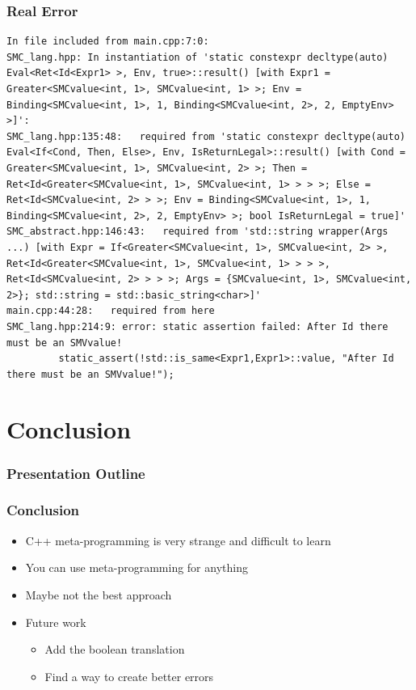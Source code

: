 \documentclass{beamer}
\begin{document}
\begin{frame}[fragile]
\frametitle{Real Error}
\begin{tiny}
\begin{lstlisting}[basicstyle=\tiny]
In file included from main.cpp:7:0:
SMC_lang.hpp: In instantiation of 'static constexpr decltype(auto) Eval<Ret<Id<Expr1> >, Env, true>::result() [with Expr1 = Greater<SMCvalue<int, 1>, SMCvalue<int, 1> >; Env = Binding<SMCvalue<int, 1>, 1, Binding<SMCvalue<int, 2>, 2, EmptyEnv> >]':
SMC_lang.hpp:135:48:   required from 'static constexpr decltype(auto) Eval<If<Cond, Then, Else>, Env, IsReturnLegal>::result() [with Cond = Greater<SMCvalue<int, 1>, SMCvalue<int, 2> >; Then = Ret<Id<Greater<SMCvalue<int, 1>, SMCvalue<int, 1> > > >; Else = Ret<Id<SMCvalue<int, 2> > >; Env = Binding<SMCvalue<int, 1>, 1, Binding<SMCvalue<int, 2>, 2, EmptyEnv> >; bool IsReturnLegal = true]'
SMC_abstract.hpp:146:43:   required from 'std::string wrapper(Args ...) [with Expr = If<Greater<SMCvalue<int, 1>, SMCvalue<int, 2> >, Ret<Id<Greater<SMCvalue<int, 1>, SMCvalue<int, 1> > > >, Ret<Id<SMCvalue<int, 2> > > >; Args = {SMCvalue<int, 1>, SMCvalue<int, 2>}; std::string = std::basic_string<char>]'
main.cpp:44:28:   required from here
SMC_lang.hpp:214:9: error: static assertion failed: After Id there must be an SMVvalue!
         static_assert(!std::is_same<Expr1,Expr1>::value, "After Id there must be an SMVvalue!");
\end{lstlisting}
\end{tiny}
\end{frame}
\section{Conclusion}

\begin{frame}[fragile]
\frametitle{Presentation Outline}
\tableofcontents[currentsection]
\end{frame}

\begin{frame}
\frametitle{Conclusion}
\begin{itemize}
\item C++ meta-programming is very strange and difficult to learn
\item You can use meta-programming for anything
\item Maybe not the best approach
\item Future work
\begin{itemize}
\item Add the boolean translation
\item Find a way to create better errors
\end{itemize}
\end{itemize}
\end{frame}
\end{document}
